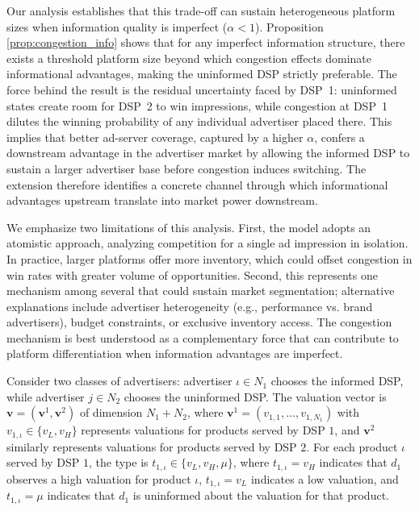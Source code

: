 \documentclass[11pt]{article}
\theoremstyle{plain}
\theoremstyle{definition}
\theoremstyle{plain}
\theoremstyle{plain}
\theoremstyle{plain}
\theoremstyle{plain}
\numberwithin{equation}{section}
\begin{document}
\noindent Our analysis establishes that this trade-off can sustain heterogeneous platform sizes when information quality is imperfect ($\alpha < 1$). Proposition \ref{prop:congestion_info} shows that for any imperfect information structure, there exists a threshold platform size beyond which congestion effects dominate informational advantages, making the uninformed DSP strictly preferable. The force behind the result is the residual uncertainty faced by DSP~1: uninformed states create room for DSP~2 to win impressions, while congestion at DSP~1 dilutes the winning probability of any individual advertiser placed there. This implies that better ad-server coverage, captured by a higher $\alpha$, confers a downstream advantage in the advertiser market by allowing the informed DSP to sustain a larger advertiser base before congestion induces switching. The extension therefore identifies a concrete channel through which informational advantages upstream translate into market power downstream. 

\vspace{0.2cm}

\noindent We emphasize two limitations of this analysis. First, the model adopts an atomistic approach, analyzing competition for a single ad impression in isolation. In practice, larger platforms offer more inventory, which could offset congestion in win rates with greater volume of opportunities. Second, this represents one mechanism among several that could sustain market segmentation; alternative explanations include advertiser heterogeneity (e.g., performance vs. brand advertisers), budget constraints, or exclusive inventory access. The congestion mechanism is best understood as a complementary force that can contribute to platform differentiation when information advantages are imperfect.

\vspace{0.4cm}

\noindent Consider two classes of advertisers: advertiser $\iota \in N_1$ chooses the informed DSP, while advertiser $j \in N_2$ chooses the uninformed DSP. The valuation vector is $\bm{v} = (\bm{v}^1, \bm{v}^2)$ of dimension $N_1 + N_2$, where $\bm{v}^1 = (v_{1,1}, \ldots, v_{1,N_1})$ with $v_{1,\iota} \in \{v_L, v_H\}$ represents valuations for products served by DSP $1$, and $\bm{v}^2$ similarly represents valuations for products served by DSP $2$. For each product $\iota$ served by DSP $1$, the type is $t_{1,\iota} \in \{v_L, v_H, \mu\}$, where $t_{1,\iota} = v_H$ indicates that $d_1$ observes a high valuation for product $\iota$, $t_{1,\iota} = v_L$ indicates a low valuation, and $t_{1,\iota} = \mu$ indicates that $d_1$ is uninformed about the valuation for that product. \par 
\vspace{2mm}
\end{document}
